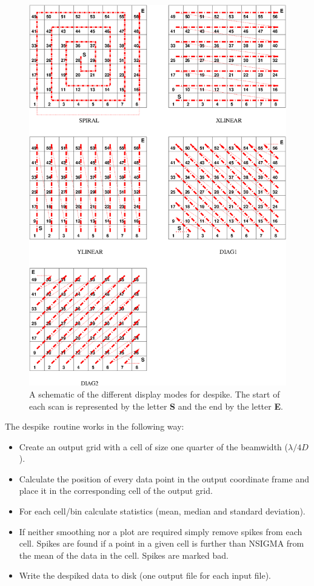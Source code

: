 \documentclass[twoside,11pt]{article}
\newcommand{\task}[1]{{\sf #1}}
\newcommand{\despike}{\htmlref{\task{despike}}{DESPIKE}}
\newcommand{\htmlref}[2]{#1}
\renewcommand{\_}{\texttt{\symbol{95}}}
\begin{document}
\begin{figure}
\begin{center}
\includegraphics[width=5in]{sun216_despikemodes.eps}
\caption{A schematic of the different display modes for \task{despike}. The
start of each scan is represented by the letter \textbf{S} and the end by the
letter \textbf{E}.}
\label{fig:despikemodes}
\end{center}
\end{figure}


  The \despike\ routine works in the following way:
     
\begin{itemize}
\item Create an output grid with a cell of size one quarter of the beamwidth ($\lambda/4D$).
\item Calculate the position of every data point in the output coordinate
           frame and place it in the corresponding cell of the output grid.
\item For each cell/bin calculate statistics (mean, median and standard
           deviation).
\item If neither smoothing nor a plot are required simply remove spikes
           from each cell. Spikes are found if a point in a given cell is
further than  NSIGMA from the mean of the data in the cell. Spikes are marked
bad. 
\item Write the despiked data to disk (one output file for each input
           file).

\end{itemize}
\end{document}
